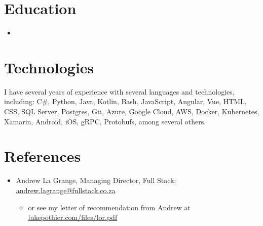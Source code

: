 \documentclass[11pt,a4paper,sans]{moderncv}
\begin{document}
\section{Education}

\vspace{3pt}

\begin{itemize}

\item{}

\end{itemize}

\vspace{2pt}

\section{Technologies}

\vspace{1pt}

I have several years of experience with several languages and technologies, including: C\#, Python, Java, Kotlin, Bash, JavaScript, Angular, Vue, HTML, CSS, SQL Server, Postgres, Git, Azure, Google Cloud, AWS, Docker, Kubernetes, Xamarin, Android, iOS, gRPC, Protobufs, among several others.

\section{References}

\vspace{3pt}

\begin{itemize}

\item Andrew La Grange, Managing Director, Full Stack: \href{mailto:andrew.lagrange@fullstack.co.za}{andrew.lagrange@fullstack.co.za}
\begin{itemize}
\item or see my letter of recommendation from Andrew at \href{https://lukepothier.com/files/lor.pdf}{lukepothier.com/files/lor.pdf}
\end{itemize}

\end{itemize}

\nocite{*}


\end{document}
